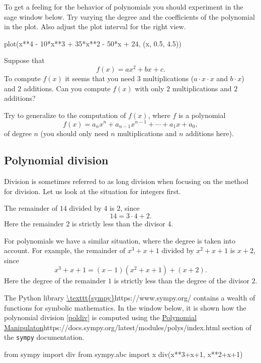 \documentclass{article}
\begin{document}
To get a feeling for the behavior of polynomials you should experiment in the sage
window below. Try varying the degree and the coefficients of the polynomial in the plot.
Also adjust the plot interval for the right view.

\begin{sage}
  plot(x**4 - 10*x**3 + 35*x**2 - 50*x + 24, (x, 0.5, 4.5))
\end{sage}

\beginshex
Suppose that
$$
f(x) = a x^2 + b x + c.
$$
To compute $f(x)$ it seems that you need $3$ multiplications
($a\cdot x\cdot x$ and $b\cdot x$) and $2$ additions.
Can you compute $f(x)$ with only $2$ multiplications and $2$ additions?

Try to generalize to the computation of $f(x)$, where $f$ is a polynomial
$$
f(x) = a_n x^n + a_{n-1} x^{n-1} + \cdots + a_1 x + a_0,
$$
of degree $n$ (you should only need $n$ multiplications and $n$ additions here).
\endshex

\subsection{Polynomial division}

Division is sometimes referred to as long division when
focusing on the method for division. Let us look
at the situation for integers first.

The remainder of 
$14$ divided by $4$ is $2$, since
$$
14 = 3\cdot 4 + 2.
$$
Here the remainder $2$ is strictly less than the divisor $4$.

For polynomials we have a similar situation, where the degree
is taken into account. For example, the remainder of
$x^3 + x + 1$ divided by $x^2 + x + 1$ is $x+2$, since
\begin{equation}\label{poldiv}
x^3 + x + 1 = (x-1)(x^2 + x + 1) + (x+2).
\end{equation}
Here the degree of the remainder $1$ is strictly less 
than the degree of the divisor $2$.

The Python library \url{\texttt{sympy}}{https://www.sympy.org/} contains a
wealth of functions for symbolic mathematics. In the window
below, it is shown how the polynomial division \eqref{poldiv}
is computed using the
\url{Polynomial Manipulaton}{https://docs.sympy.org/latest/modules/polys/index.html} section
of the \texttt{sympy} documentation.

\begin{sage}
from sympy import div
from sympy.abc import x
div(x**3+x+1, x**2+x+1)
\end{sage}
\end{document}
